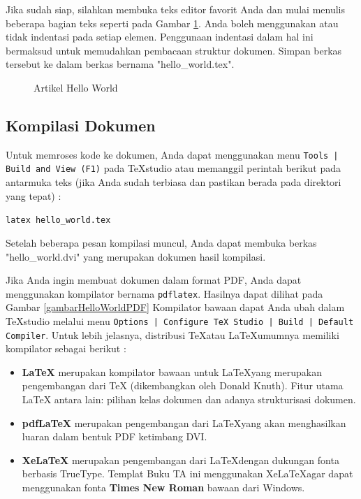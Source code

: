 \documentclass{ta-its}
\begin{document}
        Jika sudah siap, silahkan membuka teks editor favorit Anda dan mulai menulis beberapa bagian teks seperti pada Gambar \ref{kodeHelloWorld}. Anda boleh menggunakan atau tidak indentasi pada setiap elemen. Penggunaan indentasi dalam hal ini bermaksud untuk memudahkan pembacaan struktur dokumen. Simpan berkas tersebut ke dalam berkas bernama "hello\_world.tex".
        
        \begin{figure}[h]
	        
	        \caption{Artikel Hello World}
	        \label{kodeHelloWorld}
        \end{figure}
        
        \subsection{Kompilasi Dokumen}
        
        Untuk memroses kode ke dokumen, Anda dapat menggunakan menu \texttt{Tools | Build and View (F1)} pada \TeX{}studio atau memanggil perintah berikut pada antarmuka teks (jika Anda sudah terbiasa dan pastikan berada pada direktori yang tepat) :
        
        \texttt{latex hello\_world.tex}
        
        Setelah beberapa pesan kompilasi muncul, Anda dapat membuka berkas "hello\_world.dvi" yang merupakan dokumen hasil kompilasi.
        
        Jika Anda ingin membuat dokumen dalam format PDF, Anda dapat menggunakan kompilator bernama \texttt{pdflatex}. Hasilnya dapat dilihat pada Gambar \ref{gambarHelloWorldPDF} Kompilator bawaan dapat Anda ubah dalam \TeX{}studio melalui menu \texttt{Options | Configure TeX Studio | Build | Default Compiler}. Untuk lebih jelasnya, distribusi \TeX atau \LaTeX umumnya memiliki kompilator sebagai berikut :
        
        \begin{itemize}
	        \item \textbf{\LaTeX} merupakan kompilator bawaan untuk \LaTeX yang merupakan pengembangan dari \TeX{} (dikembangkan oleh Donald Knuth). Fitur utama \LaTeX{} antara lain: pilihan kelas dokumen dan adanya strukturisasi dokumen.
	        \item \textbf{pdf\LaTeX} merupakan pengembangan dari \LaTeX yang akan menghasilkan luaran dalam bentuk PDF ketimbang DVI.
	        \item \textbf{Xe\LaTeX} merupakan pengembangan dari \LaTeX dengan dukungan fonta berbasis TrueType. Templat Buku TA ini menggunakan Xe\LaTeX agar dapat menggunakan fonta \textbf{Times New Roman} bawaan dari Windows.
        \end{itemize} 
         
\end{document}
